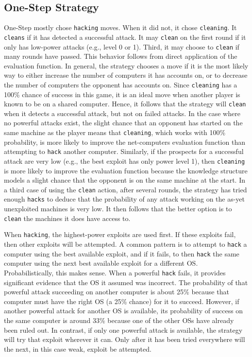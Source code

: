 \subsection{One-Step Strategy}
One-Step mostly chose {\tt hacking} moves.
When it did not, it chose {\tt cleaning}.
It {\tt cleans} if it has detected a successful attack.
It may {\tt clean} on the first round if it only has low-power attacks (e.g., level 0 or 1).
Third, it may choose to {\tt clean} if many rounds have passed.
This behavior follows from direct application of the evaluation function.
In general, the strategy chooses a move if it is the most likely way to either increase the number of computers it has accounts on, or to decrease the number of computers the opponent has accounts on. Since {\tt cleaning} has a 100\% chance of success in this game, it is an ideal move when another player is known to be on a shared computer. 
Hence, it follows that the strategy will {\tt clean} when it detects a successful attack, but not on failed attacks. 
In the case where no powerful attacks exist, the slight chance that an opponent has started on the same machine as the player means that {\tt cleaning}, which works with 100\% probability, is more likely to improve the net-computers evaluation function than attempting to {\tt hack} another computer.
Similarly, if the prospects for a successful attack are very low (e.g., the best exploit has only power level 1), then {\tt cleaning} is more likely to improve the evaluation function because the knowledge structure models a slight chance that the opponent is on the same machine at the start.
In a third case of using the {\tt clean} action, after several rounds, the strategy has tried enough {\tt hacks} to deduce that the probability of any attack working on the as-yet unexploited machines is very low.
It then follows that the better option is to {\tt clean} the machines it does have access to.

When {\tt hacking}, the highest-power exploits are used first.
If these exploits fail, then other exploits will be attempted.
A common pattern is to attempt to {\tt hack} a computer using the best available exploit, and if it fails, to then {\tt hack} the same computer using the next best available exploit for a different OS.
Probabilistically, this makes sense. 
When a powerful {\tt hack} fails, it provides significant evidence that the OS it assumed was incorrect.
The probability of that powerful attack succeeding on another computer is about 25\% because that computer must have the right OS (a 25\% chance) for it to succeed.
However, if another powerful attack for another OS is available, its probability of success on the same computer is around 33\% because one of the other OSs have already been ruled out.
In contrast, if only one powerful attack is available, the strategy will try that exploit wherever it can.
Only after it has been tried everywhere will the next, in this case weak, exploit be attempted.

